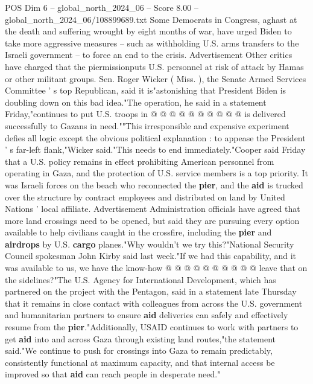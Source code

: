 \begin{textsample}{POS Dim 6 – global\_north\_2024\_06 – Score 8.00 – global\_north\_2024\_06/108899689.txt}
Some Democrats in Congress, aghast at the death and suffering wrought by eight months of war, have urged Biden to take more aggressive measures -- such as withholding U.S. arms transfers to the Israeli government -- to force an end to the crisis.
Advertisement Other critics have charged that the piermissionputs U.S. personnel at risk of attack by Hamas or other militant groups.
Sen.
Roger Wicker ( Miss. ), the Senate Armed Services Committee ' s top Republican, said it is"astonishing that President Biden is doubling down on this bad idea."The operation, he said in a statement Friday,"continues to put U.S. troops in @ @ @ @ @ @ @ @ @ @ is delivered successfully to Gazans in need.""This irresponsible and expensive experiment defies all logic except the obvious political explanation : to appease the President ' s far-left flank,"Wicker said."This needs to end immediately."Cooper said Friday that a U.S. policy remains in effect prohibiting American personnel from operating in Gaza, and the protection of U.S. service members is a top priority.
It was Israeli forces on the beach who reconnected the \textbf{pier}, and the \textbf{aid} is trucked over the structure by contract employees and distributed on land by United Nations ' local affiliate.
Advertisement Administration officials have agreed that more land crossings need to be opened, but said they are pursuing every option available to help civilians caught in the crossfire, including the \textbf{pier} and \textbf{airdrops} by U.S. \textbf{cargo} planes."Why wouldn't we try this?"National Security Council spokesman John Kirby said last week."If we had this capability, and it was available to us, we have the know-how @ @ @ @ @ @ @ @ @ @ leave that on the sidelines?"The U.S.
Agency for International Development, which has partnered on the project with the Pentagon, said in a statement late Thursday that it remains in close contact with colleagues from across the U.S. government and humanitarian partners to ensure \textbf{aid} deliveries can safely and effectively resume from the \textbf{pier}."Additionally, USAID continues to work with partners to get \textbf{aid} into and across Gaza through existing land routes,"the statement said."We continue to push for crossings into Gaza to remain predictably, consistently functional at maximum capacity, and that internal access be improved so that \textbf{aid} can reach people in desperate need."

\end{textsample}
